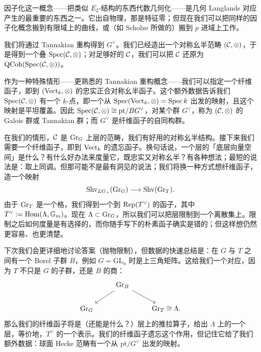 因子化这一概念——把类似 $E_2$-结构的东西代数几何化——是几何 Langlands 对应产生的最重要的东西之一。它出自物理，那是特征零；但现在我们可以把同样的因子化概念搬到有限域上的曲线，或（如 Scholze 所做的）搬到 $p$ 进域上工作。

我们将通过 Tannakian 重构得到 $G^\vee$。我们已经造出一个对称幺半范畴 $(\mathcal{C},\otimes)$，于是得到一个叠 $\operatorname{Spec}(\mathcal{C},\otimes)$；对足够好的 $\mathcal{C}$，我们可以把 $\mathcal{C}$ 还原为 $\mathrm{QCoh}(\operatorname{Spec}(\mathcal{C},\otimes))$。


作为一种特殊情形——更熟悉的 Tannakian 重构概念——我们可以指定一个纤维函子，即到 $(\mathrm{Vect}_k,\otimes)$ 的忠实正合对称幺半函子。这个额外数据告诉我们 $\operatorname{Spec}(\mathcal{C},\otimes)$ 有一个 $k$-点，即一个从 $\operatorname{Spec}(\mathrm{Vect}_k,\otimes)=\operatorname{Spec} k$ 出发的映射，且这个映射是平坦覆盖。因此 $\operatorname{Spec}(\mathcal{C},\otimes)\cong \mathrm{pt}/BG^\vee$，对某个群 $G^\vee$，称为 $(\mathcal{C},\otimes)$ 的 Galois 群或 Tannakian 群；而 $G^\vee$ 是纤维函子的自同构群。

在我们的情形，$\mathcal{C}$ 是 $\mathrm{Gr}_G$ 上层的范畴，我们有好用的对称幺半结构。接下来我们需要一个纤维函子，即到 $\mathrm{Vect}_k$ 的遗忘函子。换句话说，一个层的「底层向量空间」是什么？有什么好办法来度量它，既忠实又对称幺半？有各种想法；最短的说法是：取上同调。但那可能不是最有洞见的说法；我们将换一种方式想纤维函子，造一个映射
\[
  \mathrm{Shv}_{LG_+}(\mathrm{Gr}_G)\longrightarrow \mathrm{Shv}(\mathrm{Gr}_T).
\]
由于 $\mathrm{Gr}_T$ 是一个格，我们得到一个到 $\operatorname{Rep}(T^\vee)$ 的函子，其中 $T^\vee:=\operatorname{Hom}(\Lambda,\mathbb{G}_m)$。现在 $\Lambda\subset\mathrm{Gr}_G$，所以我们可以把层限制到一个离散集上。限制之后如何度量是有选择的，而你随手写下的朴素函子确实是错的；但这样想仍然更容易、也更清楚。

下次我们会更详细地讨论答案（抛物限制），但数据的快速总结是：在 $G$ 与 $T$ 之间有一个 Borel 子群 $B$，例如 $G=\mathrm{GL}_n$ 时是上三角矩阵。这给我们一个对应，因为 $T$ 不只是 $G$ 的子群，还是 $B$ 的商：
\[
  \begin{tikzcd}
    & \Gr_B \arrow[dl] \arrow[dr] & \\
    \Gr_G & & \Gr_T\cong\Lambda.
  \end{tikzcd}
\]
那么我们的纤维函子将是（还能是什么？）层上的推拉算子，给出 $\Lambda$ 上的一个层，等价地，$T^\vee$ 的一个表示。我们的纤维函子遗忘这个作用，但记住它给了我们额外数据：球面 Hecke 范畴有一个从 $\mathrm{pt}/G^\vee$ 出发的映射。
